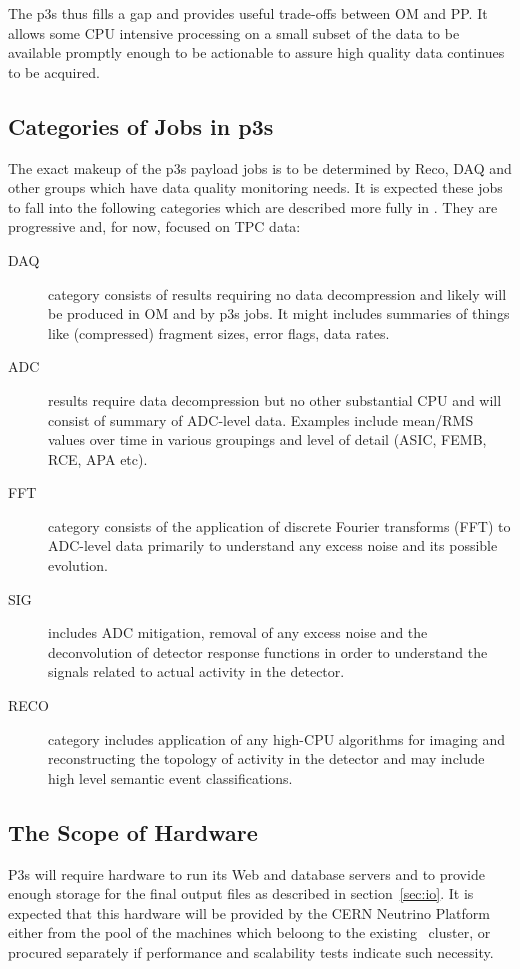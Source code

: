 \documentclass[pdftex,12pt,letter]{article}
\begin{document}
The p3s thus fills a gap and provides useful trade-offs between OM and
PP.  It allows some CPU intensive processing on a small subset of the
data to be available promptly enough to be actionable to assure high
quality data continues to be acquired. 


\subsection{Categories of Jobs in p3s}
\label{sec:categories}

The exact makeup of the p3s payload jobs is to be determined by Reco,
DAQ and other groups which have data quality monitoring needs.  It is
expected these jobs to fall into the following categories which are
described more fully in \cite{docdb1811}.  They are progressive and,
for now, focused on TPC data:

\begin{description}

\item[DAQ] category consists of results requiring no data
  decompression and likely will be produced in OM and by p3s jobs.  It
  might includes summaries of things like (compressed) fragment sizes,
  error flags, data rates.

\item[ADC] results require data decompression but no other substantial
  CPU and will consist of summary of ADC-level data.  Examples include
  mean/RMS values over time in various groupings and level of detail
  (ASIC, FEMB, RCE, APA etc).

\item[FFT] category consists of the application of discrete Fourier
  transforms (FFT) to ADC-level data primarily to understand any
  excess noise and its possible evolution.

\item[SIG] includes ADC mitigation, removal of any excess noise and
  the deconvolution of detector response functions in order to
  understand the signals related to actual activity in the detector.

\item[RECO] category includes application of any high-CPU algorithms
  for imaging and reconstructing the topology of activity in the
  detector and may include high level semantic event classifications.

\end{description}

\subsection{The Scope of Hardware}
P3s will require hardware to run its Web and database servers
and to provide enough storage for the final output files as described in
section~\ref{sec:io}.  It is expected that this hardware will be provided
by the CERN Neutrino Platform either from the pool of the machines
which beloong to the existing~\cite{neut} cluster, or procured separately
if performance and scalability tests indicate such necessity.
\end{document}
